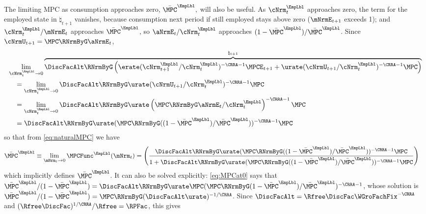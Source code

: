 \documentclass{econark}
\begin{document}
The limiting MPC as consumption approaches zero, $\bar{\MPC}^{\EmpLbl},$ will also be useful.  As ${\cNrm}^{\EmpLbl}_{t}$ approaches zero, the term for the employed state in $\natural_{t+1}$ vanishes, because consumption next period if still employed stays above zero ($\mNrmE_{t+1}$ exceeds 1); and ${\cNrm}^{\EmpLbl}_{t}/\mNrmE_{t}$ approaches $\bar{\MPC}^{\EmpLbl}$, so $\aNrmE_{t}/{\cNrm}^{\EmpLbl}_{t}$ approaches $(1-\bar{\MPC}^{\EmpLbl})/\bar{\MPC}^{\EmpLbl}$.  Since $\cNrmU_{t+1} = \MPC\RNrmByG\aNrmE_{t}$,
\begin{equation}\begin{gathered}\begin{aligned}
& \lim_{{\cNrm}^{\EmpLbl}_{t} \rightarrow 0}  \overbrace{ \DiscFacAlt \RNrmByG \left(\erate ({\cNrm}^{\EmpLbl}_{t+1}/{\cNrm}^{\EmpLbl}_{t})^{-\CRRA-1}\MPCE_{t+1}  + \urate (\cNrmU_{t+1}/{\cNrm}^{\EmpLbl}_{t})^{-\CRRA-1}\MPC\right)}^{\natural_{t+1}}
\\ & \quad =  \lim_{{\cNrm}^{\EmpLbl}_{t} \rightarrow 0} \DiscFacAlt \RNrmByG \urate (\cNrmU_{t+1}/{\cNrm}^{\EmpLbl}_{t})^{-\CRRA-1}\MPC
\\ & \quad =  \lim_{{\cNrm}^{\EmpLbl}_{t} \rightarrow 0} \DiscFacAlt \RNrmByG \urate \left(\MPC \RNrmByG \aNrmE_{t}/{\cNrm}^{\EmpLbl}_{t}\right)^{-\CRRA-1}\MPC
\\ & \quad =  \DiscFacAlt \RNrmByG \urate (\MPC \RNrmByG ((1-\bar{\MPC}^{\EmpLbl})/\bar{\MPC}^{\EmpLbl}))^{-\CRRA-1}\MPC
\end{aligned}\end{gathered}\end{equation}
so that from \eqref{eq:naturalMPC} we have 
\begin{equation}\begin{gathered}\begin{aligned}
  \bar{\MPC}^{\EmpLbl} \equiv \lim_{\mNrm_{t} \rightarrow 0} \MPCFunc^{\EmpLbl}(\mNrm_{t}) & =  \left(\frac{
\DiscFacAlt \RNrmByG \urate (\MPC \RNrmByG ((1-\bar{\MPC}^{\EmpLbl})/\bar{\MPC}^{\EmpLbl}))^{-\CRRA-1}\MPC
}{1+
\DiscFacAlt \RNrmByG \urate (\MPC \RNrmByG ((1-\bar{\MPC}^{\EmpLbl})/\bar{\MPC}^{\EmpLbl}))^{-\CRRA-1}\MPC
}\right) \label{eq:MPCat0}
\end{aligned}\end{gathered}\end{equation}
which implicitly defines $\bar{\MPC}^{\EmpLbl}$.  It can also be solved explicitly: \eqref{eq:MPCat0} says that $\bar{\MPC}^{\EmpLbl}/(1-\bar{\MPC}^{\EmpLbl}) = \DiscFacAlt \RNrmByG \urate \MPC (\MPC \RNrmByG (1-\bar{\MPC}^{\EmpLbl})/\bar{\MPC}^{\EmpLbl})^{-\CRRA-1}$, whose solution is $\bar{\MPC}^{\EmpLbl}/(1-\bar{\MPC}^{\EmpLbl}) = \MPC \RNrmByG (\DiscFacAlt \urate)^{-1/\CRRA}$.  Since $\DiscFacAlt = \Rfree \DiscFac \WGroFachFix^{-\CRRA}$ and $(\Rfree\DiscFac)^{1/\CRRA}/\Rfree = \RPFac$, this gives
\end{document}
